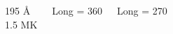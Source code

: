 \documentclass{beamer}
\begin{document}
{\begin{columns}
\vskip 1cm
195 \AA\\
1.5 MK
\begin{center}
Long = 360\deg\\
\end{center}
\begin{center}
Long = 270\deg\\
\end{center}
\end{columns}}
\end{document}
